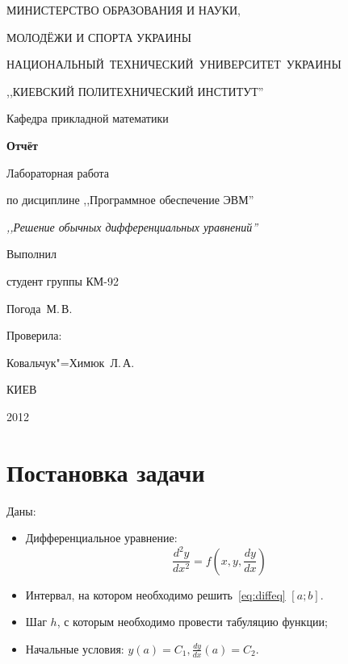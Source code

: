 \documentclass[a4paper,12pt,notitlepage,headsepline,pdftex]{scrartcl}
\begin{document}
\begin{titlepage}
  \begin{center}
    \large
    \MakeUppercase{Министерство образования и науки,}

    \MakeUppercase{молодёжи и спорта Украины}

    \mbox{\MakeUppercase{Национальный технический университет Украины}}

    \MakeUppercase{,,Киевский политехнический институт''}

    \addvspace{6pt}

    \normalsize
    Кафедра прикладной математики

    \vfill

    \textbf{Отчёт}

    Лабораторная работа 

    по дисциплине ,,Программное обеспечение ЭВМ''

    \emph{,,Решение обычных дифференциальных уравнений''}
  \end{center}

  \vfill

  \noindent
  \begin{minipage}{0.3\textwidth}
    Выполнил

    студент группы КМ-92

    Погода~М.\,В.
  \end{minipage}
  \hfill
  \begin{minipage}{0.4\textwidth}
    Проверила:

    Ковальчук"=Химюк~Л.\,А.
  \end{minipage}
  \vfill

  \begin{center}
    КИЕВ

    2012
  \end{center}
\end{titlepage}
\tableofcontents
\newpage
\section{Постановка задачи}
  Даны:
  \begin{itemize}
    \item Дифференциальное уравнение:
      \begin{equation}
        \frac{d^2 y}{dx^2} = f\left( x, y, \frac{dy}{dx} \right)
        \label{eq:diffeq}
      \end{equation}
    \item Интервал, на котором необходимо решить~\eqref{eq:diffeq} $\left[
        a; b \right]$.
    \item Шаг $h$, с которым необходимо провести табуляцию функции;
    \item Начальные условия: $y\left( a \right) = C_1, \frac{dy}{dx}\left(
        a \right) = C_2$.
  \end{itemize}
\end{document}
